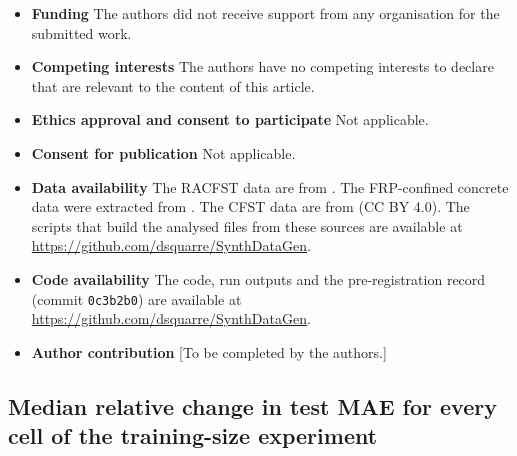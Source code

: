 \documentclass[pdflatex,sn-basic]{sn-jnl}
\begin{document}
\begin{itemize}
\item \textbf{Funding} %
The authors did not receive support from any organisation for the submitted work.
\item \textbf{Competing interests} %
The authors have no competing interests to declare that are relevant to the content of this article.
\item \textbf{Ethics approval and consent to participate} Not applicable.
\item \textbf{Consent for publication} Not applicable.
\item \textbf{Data availability} The RACFST data are from \citet{xu2020racfst}. The FRP-confined concrete data
were extracted from \citet{ozbakkaloglu2013database}. The CFST data are from \citet{thai2021data} (CC BY 4.0).
The scripts that build the analysed files from these sources are available at
\url{https://github.com/dsquarre/SynthDataGen}.
\item \textbf{Code availability} The code, run outputs and the pre-registration record (commit \texttt{0c3b2b0})
are available at \url{https://github.com/dsquarre/SynthDataGen}.
\item \textbf{Author contribution} %
[To be completed by the authors.]
\end{itemize}

\begin{appendices}
\section{Median relative change in test MAE for every cell of the training-size experiment}\label{app:cells}

\begin{table}
\caption{Median relative change in test MAE (\%) from 1:1 augmentation over 20 draws. Bold: Harm under the
pre-registered rule; no cell showed a Benefit. GC: Gaussian Copula. $^{\dagger}$Exploratory}\label{tab:cells}
\scriptsize

\end{table}
\end{appendices}


\end{document}
